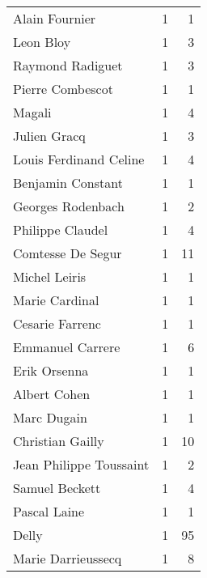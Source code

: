 \begin{xltabular}{\textwidth}{lrr}
                      Alain Fournier &          1 &                1 \\
                           Leon Bloy &          1 &                3 \\
                    Raymond Radiguet &          1 &                3 \\
                    Pierre Combescot &          1 &                1 \\
                              Magali &          1 &                4 \\
                        Julien Gracq &          1 &                3 \\
              Louis Ferdinand Celine &          1 &                4 \\
                   Benjamin Constant &          1 &                1 \\
                   Georges Rodenbach &          1 &                2 \\
                    Philippe Claudel &          1 &                4 \\
                   Comtesse De Segur &          1 &               11 \\
                       Michel Leiris &          1 &                1 \\
                      Marie Cardinal &          1 &                1 \\
                     Cesarie Farrenc &          1 &                1 \\
                    Emmanuel Carrere &          1 &                6 \\
                        Erik Orsenna &          1 &                1 \\
                        Albert Cohen &          1 &                1 \\
                         Marc Dugain &          1 &                1 \\
                    Christian Gailly &          1 &               10 \\
             Jean Philippe Toussaint &          1 &                2 \\
                      Samuel Beckett &          1 &                4 \\
                        Pascal Laine &          1 &                1 \\
                               Delly &          1 &               95 \\
                  Marie Darrieussecq &          1 &                8 \\

\end{xltabular}
